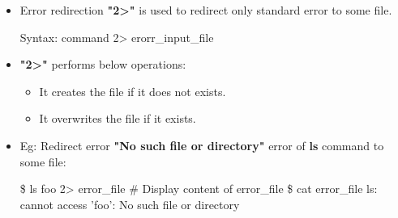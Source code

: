 \setlength{\columnsep}{3pt}
\begin{flushleft}
	\begin{itemize}
		\item Error redirection \textbf{"2>"} is used to redirect only standard error to some file.	
		\bigskip
		\begin{tcolorbox}[breakable,notitle,boxrule=-0pt,colback=pink,colframe=pink]
			\color{black}
			\font=9pt
			Syntax: command 2> erorr\_input\_file
			\font=4pt
		\end{tcolorbox}
		\item \textbf{"2>"} performs below operations:
		\begin{itemize}
			\item It creates the file if it does not exists.
			\item It overwrites the file if it exists.
		\end{itemize}
		\item Eg: Redirect error \textbf{"No such file or directory"} error of \textbf{ls} command to some file:
		\bigskip
		\begin{tcolorbox}[breakable,notitle,boxrule=-0pt,colback=black,colframe=black]
			\color{green}
			\font=9pt
			\$ ls foo 2> error\_file
			\newline
			\newline
			\color{yellow}
			\# Display content of error\_file
			\color{green}
			\newline
			\$ cat error\_file
			\newline
			\color{white}
			ls: cannot access 'foo': No such file or directory
			\font=4pt
			
			\font=4pt
		\end{tcolorbox}
	\end{itemize}
\end{flushleft}


